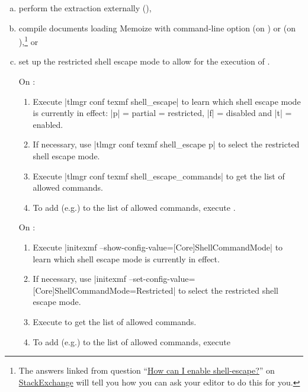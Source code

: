 \documentclass[a4paper,11pt]{article}
\begin{document}
\begin{enumerate}[(a)]
\item\label{item:fallback-external} perform the extraction externally
  (),
\item\label{item:fallback-full} compile documents loading Memoize with
  command-line option  (on \TeXLive) or
   (on \MiKTeX),\footnote{The answers linked
    from question ``\href{https://tex.stackexchange.com/q/598818/16819}{How can
      I enable shell-escape?}''
    on \href{https://tex.stackexchange.com}{ StackExchange} will
    tell you how you can ask your editor to do this for you.} or
\item\label{item:fallback-restricted} set up the restricted shell escape mode
  to allow for the execution of .
  
  On \TeXLive:
  \begin{enumerate}[1.]
  \item Execute |tlmgr conf texmf shell_escape| to learn which shell escape
    mode is currently in effect: |p| = partial = restricted, |f| = disabled and
    |t| = enabled.
  \item If necessary, use |tlmgr conf texmf shell_escape p| to select the
    restricted shell escape mode.
  \item Execute |tlmgr conf texmf shell_escape_commands| to get the
     list of allowed commands.
  \item To add (e.g.)  to the list of allowed
    commands, execute .
  \end{enumerate}

  On \MiKTeX:
  \begin{enumerate}[1.]
  \item Execute |initexmf --show-config-value=[Core]ShellCommandMode| to learn
    which shell escape mode is currently in effect.
  \item If necessary, use |initexmf
    --set-config-value=[Core]ShellCommandMode=Restricted| to select the
    restricted shell escape mode.
  \item Execute  to get the
     list of allowed commands.
  \item To add (e.g.)  to the list of allowed
    commands, execute 
  \end{enumerate}
\end{enumerate}
\end{document}
